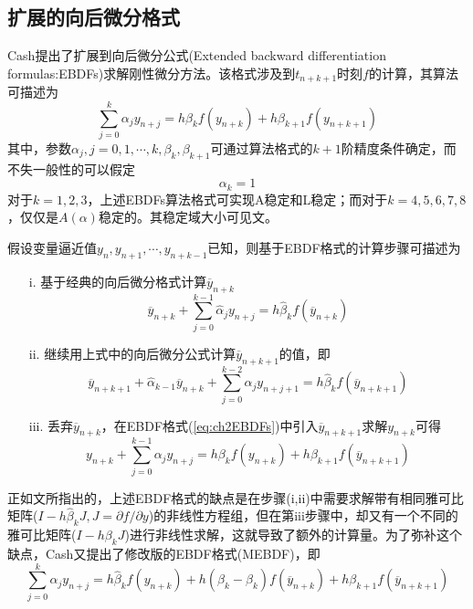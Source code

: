 \subsection{扩展的向后微分格式}
Cash提出了扩展到向后微分公式(Extended backward differentiation formulas:EBDFs)\cite{Cash1980a}求解刚性微分方法。该格式涉及到$t_{n+k+1}$时刻$f$的计算，其算法可描述为
\begin{equation}
\sum_{j=0}^{k}\alpha_jy_{n+j}=h\beta_kf(y_{n+k})+h\beta_{k+1}f(y_{n+k+1})\label{eq:ch2EBDFs}
\end{equation}
其中，参数$\alpha_j,j=0,1,\cdots,k,\beta_k,\beta_{k+1}$可通过算法格式的$k+1$阶精度条件确定，而不失一般性的可以假定
\begin{equation}
\alpha_k=1
\end{equation}
对于$k=1,2,3$，上述EBDFs算法格式可实现A稳定和L稳定；而对于$k=4,5,6,7,8$，仅仅是$A(\alpha)$稳定的。其稳定域大小可见文。

假设变量逼近值$y_n,y_{n+1},\cdots,y_{n+k-1}$已知，则基于EBDF格式的计算步骤可描述为
\begin{itemize}
\item[i.] 基于经典的向后微分格式计算$\overline{y}_{n+k}$
\begin{equation}
\overline{y}_{n+k}+\sum_{j=0}^{k-1}\hat{\alpha}_jy_{n+j}=h\hat{\beta}_kf(\overline{y}_{n+k})
\end{equation}
\item[ii.] 继续用上式中的向后微分公式计算$\overline{y}_{n+k+1}$的值，即
\begin{equation}
\overline{y}_{n+k+1}+\hat{\alpha}_{k-1}\overline{y}_{n+k}+\sum_{j=0}^{k-2}\hat{\alpha}_jy_{n+j+1}=h\hat{\beta}_kf(\overline{y}_{n+k+1})
\end{equation}
\item[iii.] 丢弃$\overline{y}_{n+k}$，在EBDF格式(\ref{eq:ch2EBDFs})中引入$\overline{y}_{n+k+1}$求解$y_{n+k}$可得
\begin{equation}
y_{n+k}+\sum_{j=0}^{k-1}\alpha_jy_{n+j}=h\beta_kf(y_{n+k})+h\beta_{k+1}f(\overline{y}_{n+k+1})
\end{equation}
\end{itemize}
正如文所指出的，上述EBDF格式的缺点是在步骤(i,ii)中需要求解带有相同雅可比矩阵($I-h\hat{\beta}_kJ,J=\partial f/\partial y$)的非线性方程组，但在第iii步骤中，却又有一个不同的雅可比矩阵($I-h\beta_kJ$)进行非线性求解，这就导致了额外的计算量。为了弥补这个缺点，Cash又提出了修改版的EBDF格式(MEBDF)\cite{Cash1983c}，即
\begin{equation}
\sum_{j=0}^{k}\alpha_jy_{n+j}=h\hat{\beta}_kf(y_{n+k})+h(\beta_k-\hat{\beta}_k)f(\overline{y}_{n+k})+h\beta_{k+1}f(\overline{y}_{n+k+1})
\end{equation}


